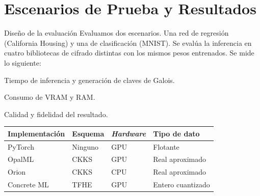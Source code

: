 \section{Escenarios de Prueba y Resultados}

\begin{frame}{Diseño de la evaluación}
    Evaluamos dos escenarios. Una red de regresión (California Housing) y una de clasificación (MNIST). Se evalúa la inferencia en cuatro bibliotecas de cifrado distintas con los mismos pesos entrenados. Se mide lo siguiente:
    \vspace{0.1cm}
    \begin{listaalineada}
        \setlength{\itemsep}{4pt}
        \item Tiempo de inferencia y generación de claves de Galois.
        \item Consumo de VRAM y RAM.
        \item Calidad y fidelidad del resultado.
    \end{listaalineada}

    \begin{center}
        \small
        \begin{tabular}{@{}llll@{}}
            \toprule
            Implementación & Esquema & \textit{Hardware} & Tipo de dato \\
            \midrule
            PyTorch     & Ninguno & GPU & Flotante          \\
            OpalML      & CKKS    & GPU & Real aproximado   \\ Orion       & CKKS    & CPU & Real aproximado   \\
            Concrete ML & TFHE    & GPU & Entero cuantizado \\
            \bottomrule
        \end{tabular}
    \end{center}
\end{frame}

